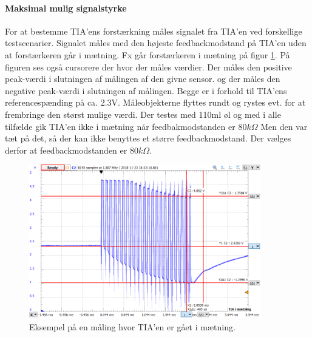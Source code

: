 \documentclass[HardwareDesign/HardwareDesign_main.tex]{subfiles}
\begin{document}
\paragraph{Maksimal mulig signalstyrke}
{
For at bestemme TIA'ens forstærkning måles signalet fra TIA'en ved forskellige testscenarier. Signalet måles med den højeste feedbackmodstand på TIA'en uden at forstærkeren går i mætning. Fx går forstærkeren i mætning på figur \ref{fig:TIA_saturation}. På figuren ses også cursorere der hvor der måles værdier. Der måles den positive peak-værdi i slutningen af målingen af den givne sensor. og der måles den negative peak-værdi i slutningen af målingen. Begge er i forhold til TIA'ens referencespænding på ca. 2.3V. Måleobjekterne flyttes rundt og rystes evt. for at frembringe den størst mulige værdi. Der testes med 110ml øl og med i alle tilfælde gik TIA'en ikke i mætning når feedbakmodstanden er $80\si{k\Omega}$ Men den var tæt på det, så der kan ikke benyttes et større feedbackmodstand. Der vælges derfor at feedbackmodstanden er $80\si{k\Omega}$.

\begin{figure}[H]
    \centering
    \includegraphics[width=0.9\textwidth]{HardwareDesign/CupSensor/graphics/TIA_saturation.png}
    \caption{Eksempel på en måling hvor TIA'en er gået i mætning.}
    \label{fig:TIA_saturation}
\end{figure}
}
\end{document}
